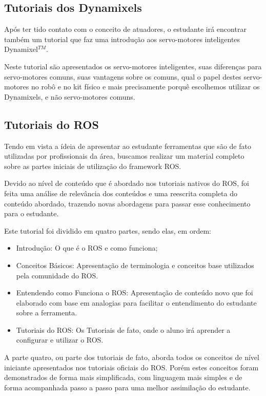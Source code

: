 \subsection{Tutoriais dos Dynamixels}
Após ter tido contato com o conceito de atuadores, o estudante irá encontrar também um tutorial que faz uma introdução aos servo-motores inteligentes Dynamixel$^{TM}$.

Neste tutorial são apresentados os servo-motores inteligentes, suas diferenças para servo-motores comuns, suas vantagens sobre os comuns, qual o papel destes servo-motores no robô e no kit físico e mais precisamente porquê escolhemos utilizar os Dynamixels, e não servo-motores comuns. \cite{tutDyna}


\subsection{Tutoriais do ROS}
Tendo em vista a ídeia de apresentar ao estudante ferramentas que são de fato utilizadas por profissionais da área, buscamos realizar um material completo sobre as partes iniciais de utilização do framework ROS.

Devido ao nível de conteúdo que é abordado nos tutoriais nativos do ROS, foi feita uma análise de relevância dos conteúdos e uma reescrita completa do conteúdo abordado, trazendo novas abordagens para passar esse conhecimento para o estudante.

Este tutorial foi dividido em quatro partes, sendo elas, em ordem:
\begin{itemize}
	\item Introdução: O que é o ROS e como funciona;
	\item Conceitos Básicos: Apresentação de terminologia e conceitos base utilizados pela comunidade do ROS.
	\item Entendendo como Funciona o ROS: Apresentação de conteúdo novo que foi elaborado com base em analogias para facilitar o entendimento do estudante sobre a ferramenta.
	\item Tutoriais do ROS: Os Tutoriais de fato, onde o aluno irá aprender a configurar e utilizar o ROS.
\end{itemize}

A parte quatro, ou parte dos tutoriais de fato, aborda todos os conceitos de nível iniciante apresentados nos tutoriais oficiais do ROS. Porém estes conceitos foram demonstrados de forma mais simplificada, com linguagem mais simples e de forma acompanhada passo a passo para uma melhor assimilação do estudante.

